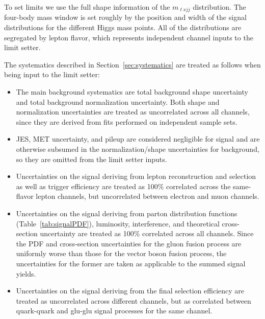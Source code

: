 To set limits we use the full shape information of the $m_{\ell\nu
jj}$ distribution.  The four-body mass window is set roughly by the
position and width of the signal distributions for the different Higgs
mass points. All of the distributions are segregated by lepton flavor,
which represents independent channel inputs to the limit setter.

The systematics described in Section~\ref{sec:systematics} are treated
as follows when being input to the limit setter:
\begin{itemize}
\item The main background systematics are total background shape
uncertainty and total background normalization uncertainty. 
Both shape and normalization uncertainties are
treated as uncorrelated across all channels, since they are derived
from fits performed on independent sample sets.
\item JES, MET uncertainty, and pileup are considered negligible for
signal and are otherwise subsumed in the normalization/shape
uncertainties for background, so they are omitted from the limit setter
inputs.
\item Uncertainties on the signal deriving from lepton reconstruction
and selection as well as trigger efficiency are treated as 100\%
correlated across the same-flavor lepton channels, but uncorrelated
between electron and muon channels.
\item Uncertainties on the signal deriving from parton distribution
functions (Table~\ref{tab:signalPDF}), luminosity, interference, and
theoretical cross-section uncertainty are treated as 100\% correlated
across all channels. Since the PDF and cross-section uncertainties for
the gluon fusion process are uniformly worse than those for the vector
boson fusion process, the uncertainties for the former are taken as
applicable to the summed signal yields.
\item Uncertainties on the signal deriving from the final selection
efficiency are treated as uncorrelated across different channels, but as
correlated between quark-quark and glu-glu signal processes for the same
channel.
\end{itemize}

